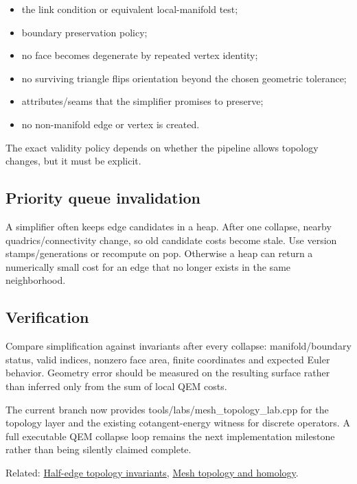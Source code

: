 \begin{itemize}
\tightlist
\item
  the link condition or equivalent local-manifold test;
\item
  boundary preservation policy;
\item
  no face becomes degenerate by repeated vertex identity;
\item
  no surviving triangle flips orientation beyond the chosen geometric tolerance;
\item
  attributes/seams that the simplifier promises to preserve;
\item
  no non-manifold edge or vertex is created.
\end{itemize}

The exact validity policy depends on whether the pipeline allows topology changes, but it must be explicit.

\subsection{Priority queue invalidation}\label{appendix-89db9fe1bc8a-priority-queue-invalidation}

A simplifier often keeps edge candidates in a heap. After one collapse, nearby quadrics/connectivity change, so old candidate costs become stale. Use version stamps/generations or recompute on pop. Otherwise a heap can return a numerically small cost for an edge that no longer exists in the same neighborhood.

\subsection{Verification}\label{appendix-89db9fe1bc8a-verification}

Compare simplification against invariants after every collapse: manifold/boundary status, valid indices, nonzero face area, finite coordinates and expected Euler behavior. Geometry error should be measured on the resulting surface rather than inferred only from the sum of local QEM costs.

The current branch now provides tools/labs/mesh\_topology\_lab.cpp for the topology layer and the existing cotangent-energy witness for discrete operators. A full executable QEM collapse loop remains the next implementation milestone rather than being silently claimed complete.

Related: \hyperref[appendix-faac749c9cdd]{Half-edge topology invariants}, \hyperref[appendix-e38976cbbf86]{Mesh topology and homology}.

